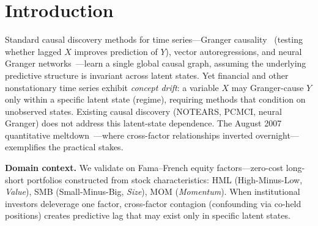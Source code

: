 \documentclass[sigconf,anonymous]{acmart}
\begin{document}


\maketitle

\section{Introduction}

Standard causal discovery methods for time series---Granger
causality~\cite{granger1969investigating} (testing whether lagged $X$
improves prediction of $Y$), vector autoregressions, and neural Granger
networks~\cite{tank2022neural}---learn a single global causal graph,
assuming the underlying predictive structure is invariant across latent
states. Yet financial and other nonstationary time series exhibit
\emph{concept drift}: a variable $X$ may Granger-cause $Y$ only within
a specific latent state (regime), requiring methods that condition on
unobserved states. Existing causal discovery (NOTEARS, PCMCI, neural
Granger) does not address this latent-state dependence. The August 2007
quantitative meltdown~\cite{khandani2011quants}---where cross-factor
relationships inverted overnight---exemplifies the practical stakes.

\textbf{Domain context.} We validate on Fama--French equity factors---zero-cost
long-short portfolios constructed from stock characteristics: HML
(High-Minus-Low, \emph{Value}), SMB (Small-Minus-Big, \emph{Size}),
MOM (\emph{Momentum}). When institutional investors deleverage one
factor, cross-factor contagion (confounding via co-held positions)
creates predictive lag that may exist only in specific latent states.
\end{document}
